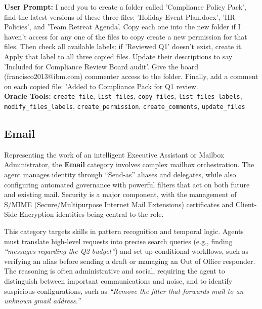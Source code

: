 \begin{taskbox}
\textbf{User Prompt:} I need you to create a folder called 'Compliance Policy Pack', find the latest versions of these three files: 'Holiday Event Plan.docx', 'HR Policies', and 'Team Retreat Agenda'. Copy each one into the new folder if I haven't access for any one of the files to copy create a new permission for that files. Then check all available labels: if 'Reviewed Q1' doesn’t exist, create it. Apply that label to all three copied files. Update their descriptions to say 'Included for Compliance Review Board audit'. Give the board (francisco2013@ibm.com) commenter access to the folder. Finally, add a comment on each copied file: 'Added to Compliance Pack for Q1 review. \\

\textbf{Oracle Tools:} \texttt{create\_file}, \texttt{list\_files}, \texttt{copy\_files}, \texttt{list\_files\_labels}, \texttt{modify\_files\_labels}, \texttt{create\_permission}, \texttt{create\_comments}, \texttt{update\_files}
\end{taskbox}

\subsection{Email}
\label{app:cat_email}

Representing the work of an intelligent Executive Assistant or Mailbox Administrator, the \textbf{Email} category involves complex mailbox orchestration. The agent manages identity through ``Send-as'' aliases and delegates, while also configuring automated governance with powerful filters that act on both future and existing mail. Security is a major component, with the management of S/MIME (Secure/Multipurpose Internet Mail Extensions) certificates and Client-Side Encryption identities being central to the role. 

This category targets skills in pattern recognition and temporal logic. Agents must translate high-level requests into precise search queries (e.g., finding \textit{``messages regarding the Q2 budget''}) and set up conditional workflows, such as verifying an alias before sending a draft or managing an Out of Office responder. The reasoning is often administrative and social, requiring the agent to distinguish between important communications and noise, and to identify suspicious configurations, such as \textit{``Remove the filter that forwards mail to an unknown gmail address.''}

